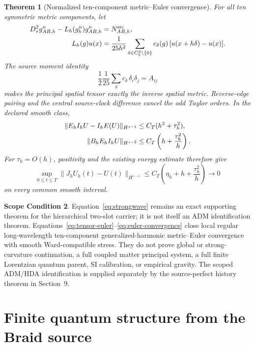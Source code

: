 \documentclass[11pt]{article}
\newtheorem{theorem}{Theorem}[section]
\theoremstyle{definition}
\newtheorem{scope}[theorem]{Scope Condition}
\theoremstyle{remark}
\begin{document}
\begin{theorem}[Normalized ten-component metric--Euler convergence]
For all ten symmetric metric components, let
\begin{align}
D_\tau^2 g_{AB,h}^n-L_h(g_h^n)g_{AB,h}^n
&=N^{\rm src}_{AB,h},\notag\\
L_h(g)u(x)
&=\frac1{25h^2}
\sum_{\delta\in C_5^3\setminus\{0\}}
c_\delta(g)\,[u(x+h\delta)-u(x)].
\label{eq:tensor-euler}
\end{align}
The source moment identity
\begin{equation}
\frac12\frac1{25}\sum_\delta c_\delta\,\delta_i\delta_j=A_{ij}
\end{equation}
makes the principal spatial tensor exactly the inverse spatial metric. Reverse-edge pairing and the central source-clock difference cancel the odd Taylor orders. In the declared smooth class,
\begin{align}
\|E_hI_hU-I_hE(U)\|_{H^{s-1}}
&\le C_T(h^2+\tau_h^2),\notag\\
\|B_hE_hI_hU\|_{H^{s-2}}
&\le C_T\left(h+\frac{\tau_h^2}{h}\right).
\label{eq:euler-residuals}
\end{align}
For $\tau_h=O(h)$, positivity and the existing energy estimate therefore give
\begin{equation}
\sup_{0\le t\le T}
\|J_hU_h(t)-U(t)\|_{H^{s-1}}
\le C_T\left(\eta_h+h+\frac{\tau_h^2}{h}\right)
\longrightarrow0
\label{eq:euler-convergence}
\end{equation}
on every common smooth interval.
\end{theorem}

\begin{scope}
Equation~\eqref{eq:strongwave} remains an exact supporting theorem for the hierarchical two-slot carrier; it is not itself an ADM identification theorem. Equations~\eqref{eq:tensor-euler}--\eqref{eq:euler-convergence} close local regular long-wavelength ten-component generalized-harmonic metric--Euler convergence with smooth Ward-compatible stress. They do not prove global or strong-curvature continuation, a full coupled matter principal system, a full finite Lorentzian quantum parent, SI calibration, or empirical gravity. The scoped ADM/HDA identification is supplied separately by the source-perfect history theorem in Section~9.
\end{scope}

\section{Finite quantum structure from the Braid source}
\end{document}
